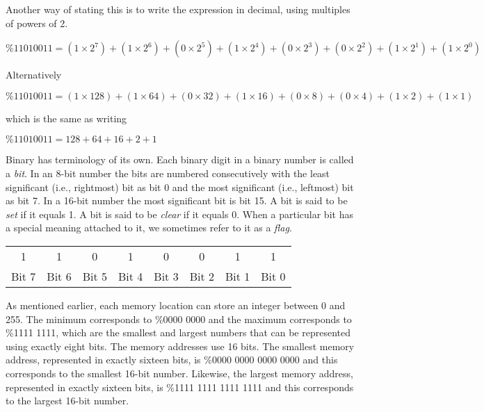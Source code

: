 Another way of stating this is to write the expression in decimal, using multiples of powers of 2.

\begin{center}
  $\%1101 0011 = (1 \times 2^{7}) + (1 \times 2^{6}) + (0 \times 2^{5}) + (1 \times 2^{4}) + (0 \times 2^{3}) + (0 \times 2^{2}) + (1 \times 2^{1}) + (1 \times 2^{0})$
\end{center}

Alternatively

\begin{center}
	$\%1101 0011 = (1 \times 128) + (1 \times 64) + (0 \times 32) + (1 \times 16) + (0 \times 8)  + (0 \times 4) + (1 \times 2) + (1 \times 1)$
\end{center}

which is the same as writing

\begin{center}
  $\%1101 0011 = 128 + 64 + 16 + 2 + 1$
\end{center}

Binary has terminology of its own. Each binary digit in a binary number is called a {\it bit}. In an 8-bit number the bits are numbered consecutively with the least significant (i.e., rightmost) bit as bit 0 and the most significant (i.e., leftmost) bit as bit 7. In a 16-bit number the most significant bit is bit 15. A bit is said to be {\it set} if it equals 1. A bit is said to be {\it clear} if it equals 0. When a particular bit has a special meaning attached to it, we sometimes refer to it as a {\it flag}.

\begin{center}
	\begin{tabular}{|c|c|c|c|c|c|c|c|}
		\hline
		1 & 1 & 0 & 1 & 0 & 0 & 1 & 1 \\ \hhline{|=|=|=|=|=|=|=|=|}
		\small{Bit 7} & \small{Bit 6} & \small{Bit 5} & \small{Bit 4} & \small{Bit 3} & \small{Bit 2} & \small{Bit 1} & \small{Bit 0} \\ \hline
	\end{tabular}
\end{center}

As mentioned earlier, each memory location can store an integer between 0 and 255. The minimum corresponds to \%0000 0000 and the maximum corresponds to \%1111 1111, which are the smallest and largest numbers that can be represented using exactly eight bits. The memory addresses use 16 bits. The smallest memory address, represented in exactly sixteen bits, is \%0000 0000 0000 0000 and this corresponds to the smallest 16-bit number. Likewise, the largest memory address, represented in exactly sixteen bits, is \%1111 1111 1111 1111 and this corresponds to the largest 16-bit number.

